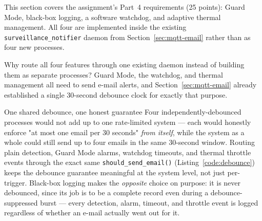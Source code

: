 \label{sec:advanced-features}


This section covers the assignment's Part~4 requirements (25 points):
Guard Mode, black-box logging, a software watchdog, and adaptive thermal
management. All four are implemented inside the existing
\texttt{surveillance\_notifier} daemon from Section~\ref{sec:mqtt-email}
rather than as four new processes.

\begin{table}[H]
\centering
\caption{Where each feature lives.}
\label{tab:advanced-locations}
\end{table}

\begin{questionsection}{Why route all four features through one existing daemon instead of building them as separate processes?}
Guard Mode, the watchdog, and thermal management all need to send e-mail
alerts, and Section~\ref{sec:mqtt-email} already established a single
30-second debounce clock for exactly that purpose.
\end{questionsection}

\begin{answersection}{One shared debounce, one honest guarantee}
Four independently-debounced processes would not add up to one
rate-limited system --- each would honestly enforce "at most one email
per 30 seconds" \emph{from itself}, while the system as a whole could
still send up to four emails in the same 30-second window. Routing plain
detection, Guard Mode alarms, watchdog timeouts, and thermal throttle
events through the exact same \texttt{should\_send\_email()}
(Listing~\ref{code:debounce}) keeps the debounce guarantee meaningful at
the system level, not just per-trigger. Black-box logging makes the
\emph{opposite} choice on purpose: it is never debounced, since its job
is to be a complete record even during a debounce-suppressed burst ---
every detection, alarm, timeout, and throttle event is logged regardless
of whether an e-mail actually went out for it.
\end{answersection}

